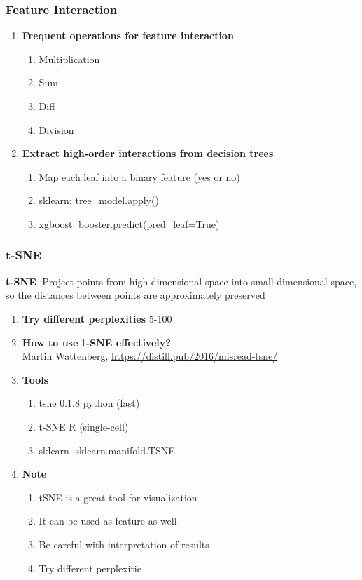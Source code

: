 \documentclass[11pt, twoside]{article}   	%
\begin{document}
\subsubsection{Feature Interaction}
\begin{enumerate}
        \item \textbf{Frequent operations for feature interaction}
    \begin{enumerate}
        \item Multiplication
        \item Sum
        \item Diff
        \item Division
     \end{enumerate}
   \item  \textbf{Extract high-order interactions from decision trees}
    \begin{enumerate}
        \item Map each leaf into a binary feature \big(yes or no\big)
        \item sklearn: tree\_model.apply\big(\big)
        \item xgboost: booster.predict\big(pred\_leaf=True\big)
        
      \end{enumerate}  
 
  \end{enumerate}


\subsubsection{t-SNE}
\textbf{t-SNE} :Project points from high-dimensional space into small dimensional space, so the distances between points are approximately preserved 
\begin{enumerate}

    \item \textbf{Try different perplexities} 5-100
    \item  \textbf{How to use t-SNE effectively?}
   \\Martin Wattenberg, \url{https://distill.pub/2016/misread-tsne/}
     \item \textbf{Tools}
         \begin{enumerate}
        \item tsne 0.1.8 python (fast)
        \item t-SNE R (single-cell)
         \item sklearn :sklearn.manifold.TSNE
          \end{enumerate}
       \item \textbf{Note}
     \begin{enumerate}
        \item tSNE is a great tool for visualization
        \item It can be used as feature as well
        \item Be careful with interpretation of results
        \item Try different perplexitie
       \end{enumerate}

 
  \end{enumerate}
\end{document}
